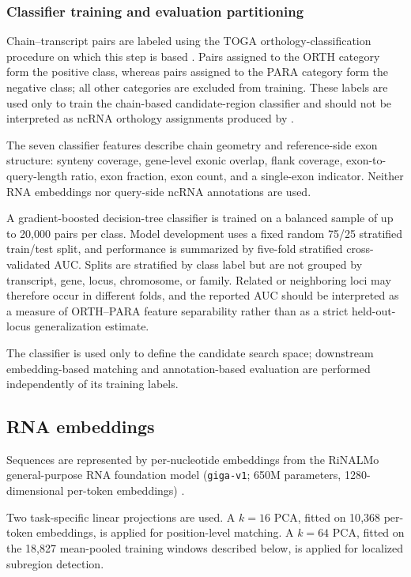\subsubsection{Classifier training and evaluation partitioning}
\label{sec:classifier-training}

Chain--transcript pairs are labeled using the TOGA orthology-classification
procedure on which this step is based
\citep{kirilenkoIntegratingGeneAnnotation2023}. Pairs assigned to the ORTH
category form the positive class, whereas pairs assigned to the PARA category
form the negative class; all other categories are excluded from training. These
labels are used only to train the chain-based candidate-region classifier and
should not be interpreted as ncRNA orthology assignments produced by \curia{}.

The seven classifier features describe chain geometry and reference-side exon
structure: synteny coverage, gene-level exonic overlap, flank coverage,
exon-to-query-length ratio, exon fraction, exon count, and a single-exon
indicator. Neither RNA embeddings nor query-side ncRNA annotations are used.

A gradient-boosted decision-tree classifier is trained on a balanced sample of up
to 20{,}000 pairs per class. Model development uses a fixed random 75/25
stratified train/test split, and performance is summarized by five-fold
stratified cross-validated AUC. Splits are stratified by class label but are not
grouped by transcript, gene, locus, chromosome, or family. Related or neighboring
loci may therefore occur in different folds, and the reported AUC should be
interpreted as a measure of ORTH--PARA feature separability rather than as a
strict held-out-locus generalization estimate.

The classifier is used only to define the candidate search space; downstream
embedding-based matching and annotation-based evaluation are performed
independently of its training labels.

\subsection{RNA embeddings}
\label{sec:embeddings}

Sequences are represented by per-nucleotide embeddings from the RiNALMo
general-purpose RNA foundation model
(\texttt{giga-v1}; 650M parameters, 1280-dimensional per-token embeddings)
\citep{penicRiNALMoGeneralpurposeRNA2025}.

Two task-specific linear projections are used. A $k{=}16$ PCA, fitted on
10{,}368 per-token embeddings, is applied for position-level matching. A
$k{=}64$ PCA, fitted on the 18{,}827 mean-pooled training windows described
below, is applied for localized subregion detection.

